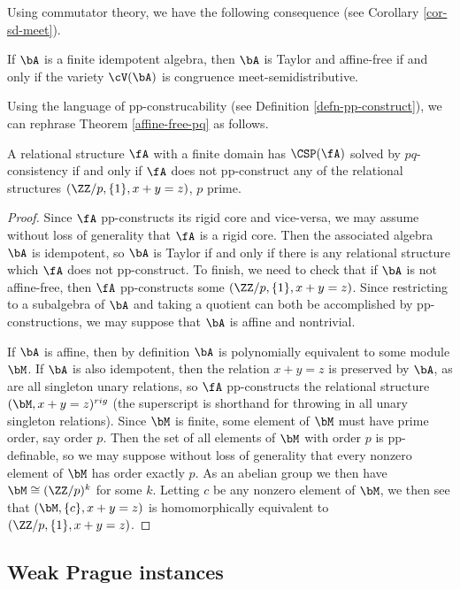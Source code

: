Using commutator theory, we have the following consequence (see Corollary \ref{cor-sd-meet}).

\begin{cor} If $\bA$ is a finite idempotent algebra, then $\bA$ is Taylor and affine-free if and only if the variety $\cV(\bA)$ is congruence meet-semidistributive.
\end{cor}

Using the language of pp-construcability (see Definition \ref{defn-pp-construct}), we can rephrase Theorem \ref{affine-free-pq} as follows.

\begin{cor} A relational structure $\fA$ with a finite domain has $\CSP(\fA)$ solved by $pq$-consistency if and only if $\fA$ does not pp-construct any of the relational structures $(\ZZ/p,\{1\},x+y=z)$, $p$ prime.
\end{cor}
\begin{proof} Since $\fA$ pp-constructs its rigid core and vice-versa, we may assume without loss of generality that $\fA$ is a rigid core. Then the associated algebra $\bA$ is idempotent, so $\bA$ is Taylor if and only if there is any relational structure which $\fA$ does not pp-construct. To finish, we need to check that if $\bA$ is not affine-free, then $\fA$ pp-constructs some $(\ZZ/p,\{1\},x+y=z)$. Since restricting to a subalgebra of $\bA$ and taking a quotient can both be accomplished by pp-constructions, we may suppose that $\bA$ is affine and nontrivial.

If $\bA$ is affine, then by definition $\bA$ is polynomially equivalent to some module $\bM$. If $\bA$ is also idempotent, then the relation $x+y=z$ is preserved by $\bA$, as are all singleton unary relations, so $\fA$ pp-constructs the relational structure $(\bM,x+y=z)^{rig}$ (the superscript is shorthand for throwing in all unary singleton relations). Since $\bM$ is finite, some element of $\bM$ must have prime order, say order $p$. Then the set of all elements of $\bM$ with order $p$ is pp-definable, so we may suppose without loss of generality that every nonzero element of $\bM$ has order exactly $p$. As an abelian group we then have $\bM \cong (\ZZ/p)^k$ for some $k$. Letting $c$ be any nonzero element of $\bM$, we then see that $(\bM,\{c\},x+y=z)$ is homomorphically equivalent to $(\ZZ/p,\{1\},x+y=z)$.
\end{proof}


\subsection{Weak Prague instances}

